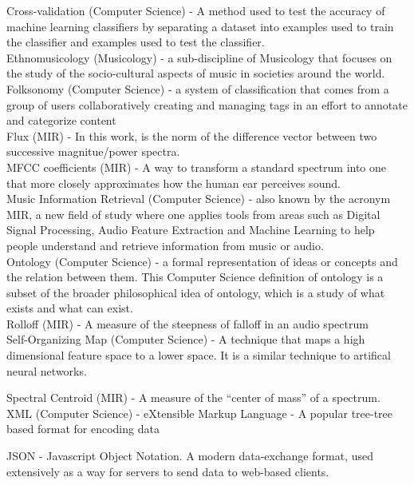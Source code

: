 \documentclass[12pt,oneside]{book}
\begin{document}
Cross-validation (Computer Science) - A method used to test the accuracy of machine learning classifiers by separating a dataset into examples used to train the classifier and examples used to test the classifier.
\\

Ethnomusicology (Musicology) - a sub-discipline of Musicology that focuses on the study of the socio-cultural aspects of music in societies around the world.
\\

Folksonomy (Computer Science) - a system of classification that comes from a group of users collaboratively creating and managing tags in an effort to annotate and categorize content
\\

Flux (MIR) - In this work, is the norm of the difference vector between two successive magnitue/power spectra.
\\

MFCC coefficients (MIR) - A way to transform a standard spectrum into one that more closely approximates how the human ear perceives sound.
\\
Music Information Retrieval (Computer Science) - also known by the acronym MIR, a new field of study where one applies tools from areas such as Digital Signal Processing, Audio Feature Extraction and Machine Learning to help people understand and retrieve information from music or audio.
\\

Ontology (Computer Science) - a formal representation of ideas or concepts and the relation between them.  This Computer Science definition of ontology is a subset of the broader philosophical idea of ontology, which is a study of what exists and what can exist.
\\

Rolloff (MIR) - A measure of the steepness of falloff in an audio spectrum
\\


Self-Organizing Map (Computer Science) - A technique that maps a high
dimensional feature space to a lower space.  It is a similar technique
to artifical neural networks.

Spectral Centroid (MIR) - A measure of the ``center of mass'' of a spectrum.
\\


XML (Computer Science) - eXtensible Markup Language - A popular
tree-tree based format for encoding data

JSON - Javascript Object Notation.  A modern data-exchange format,
used extensively as a way for servers to send data to web-based
clients.
\end{document}
